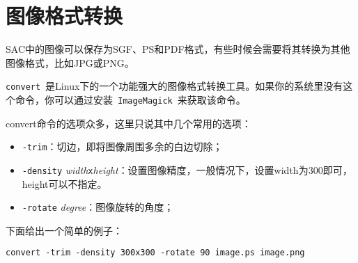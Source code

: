 \section{图像格式转换}
\label{sec:format-conversion}

SAC中的图像可以保存为SGF、PS和PDF格式，有些时候会需要将其转换为其他图像格式，比如JPG或PNG。

\lstinline{convert}~是Linux下的一个功能强大的图像格式转换工具。如果你的系统里没有这个命令，你可以通过安装~\lstinline{ImageMagick}~来获取该命令。

convert命令的选项众多，这里只说其中几个常用的选项：

\begin{itemize}
\item \lstinline{-trim}：切边，即将图像周围多余的白边切除；
\item \lstinline{-density} \textit{width}\lstinline{x}\textit{height}：设置图像精度，一般情况下，设置width为300即可，height可以不指定。
\item \lstinline{-rotate} \textit{degree}：图像旋转的角度；
\end{itemize}

下面给出一个简单的例子：

\begin{lstlisting}[style=Shell]
    convert -trim -density 300x300 -rotate 90 image.ps image.png
\end{lstlisting}

